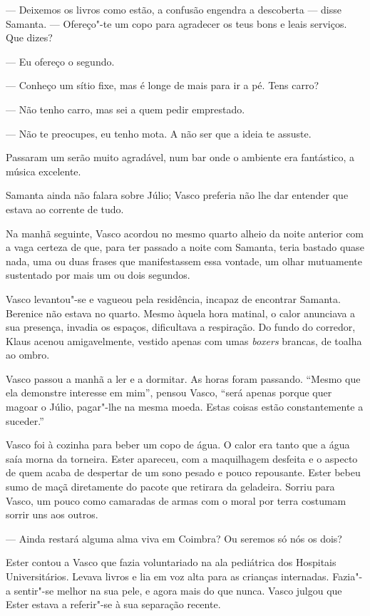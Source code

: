 --- Deixemos os livros como estão, a confusão engendra a descoberta ---
  disse Samanta. --- Ofereço"-te um copo para agradecer os teus bons e
  leais serviços. Que dizes?


--- Eu ofereço o segundo.

--- Conheço um sítio fixe, mas é longe de mais para ir a pé. Tens carro?

--- Não tenho carro, mas sei a quem pedir emprestado.

--- Não te preocupes, eu tenho mota. A não ser que a ideia te assuste.


Passaram um serão muito agradável, num bar onde o ambiente era
fantástico, a música excelente.

Samanta ainda não falara sobre Júlio; Vasco preferia não lhe dar
entender que estava ao corrente de tudo.

Na manhã seguinte, Vasco acordou no mesmo quarto alheio da noite
anterior com a vaga certeza de que, para ter passado a noite com
Samanta, teria bastado quase nada, uma ou duas frases que manifestassem
essa vontade, um olhar mutuamente sustentado por mais um ou dois
segundos.

Vasco levantou"-se e vagueou pela residência, incapaz de encontrar
Samanta. Berenice não estava no quarto. Mesmo àquela hora matinal, o
calor anunciava a sua presença, invadia os espaços, dificultava a
respiração. Do fundo do corredor, Klaus acenou amigavelmente, vestido
apenas com umas \emph{boxers }brancas, de toalha ao ombro.

Vasco passou a manhã a ler e a dormitar. As horas foram passando. ``Mesmo
que ela demonstre interesse em mim'', pensou Vasco, ``será apenas porque
quer magoar o Júlio, pagar"-lhe na mesma moeda. Estas coisas estão
constantemente a suceder.''

Vasco foi à cozinha para beber um copo de água. O calor era tanto que a
água saía morna da torneira. Ester apareceu, com a maquilhagem desfeita
e o aspecto de quem acaba de despertar de um sono pesado e pouco
repousante. Ester bebeu sumo de maçã diretamente do pacote que retirara
da geladeira. Sorriu para Vasco, um pouco como camaradas de armas com o moral
por terra costumam sorrir uns aos outros.

--- Ainda restará alguma alma viva em Coimbra? Ou seremos só nós os
  dois?


Ester contou a Vasco que fazia voluntariado na ala pediátrica dos
Hospitais Universitários. Levava livros e lia em voz alta para as
crianças internadas. Fazia"-a sentir"-se melhor na sua pele, e agora mais
do que nunca. Vasco julgou que Ester estava a referir"-se à sua separação
recente.

